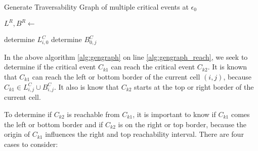 \begin{algorithm}[H]
\caption{Generate Traversability Graph of multiple critical events at $\epsilon_0$}\label{alg:gengraph}
\begin{algorithmic}[1]

	\State{}
	

	
	\State $L^R, B^R \gets$ 

	\EndFor

	 {determine $L_{i, 0}^C$} \EndFor
	 {determine $B_{0,j}^C$} \EndFor
	 
			
					
					 \label{alg:gengraph_reach}
					\EndIf
					
				\EndFor
			\EndFor
			
		
		\EndFor
	\EndFor
	

\EndFunction

\end{algorithmic}
\end{algorithm}

In the above algorithm \ref{alg:gengraph} on line \ref{alg:gengraph_reach}, we seek to determine if the critical event $C_{k1}$ can reach the critical event $C_{k2}$. It is known that $C_{k1}$ can reach the left or bottom border of the current cell $(i, j)$, because $C_{k1} \in L_{i, j}^C \cup B_{i, j}^C$. It also is know that $C_{k2}$ starts at the top or right border of the current cell.

To determine if $C_{k2}$ is reachable from $C_{k1}$, it is important to know if $C_{k1}$ comes the left or bottom border and if $C_{k2}$ is on the right or top border, because the origin of $C_{k1}$ influences the right and top reachability interval. There are four cases to consider:

